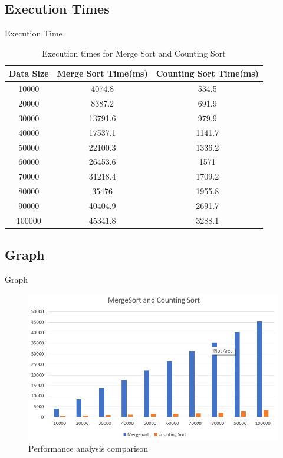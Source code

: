 \documentclass{beamer}
\begin{document}
\subsection{Execution Times}

\begin{frame}{Execution Time}
	\begin{table}
		\centering
		\begin{tabular}{|c | c | c|} 
			\hline
			Data Size  & Merge Sort Time(ms)  & Counting Sort Time(ms) \\ [0.5ex]
			\hline
			10000 & 4074.8 & 534.5 \\
			\hline
			20000 & 8387.2 & 691.9 \\
			\hline
			30000 & 13791.6 & 979.9 \\
			\hline
			40000 & 17537.1 & 1141.7 \\
			\hline
			50000 & 22100.3 & 1336.2 \\
			\hline
			60000 & 26453.6 & 1571 \\
			\hline
			70000 & 31218.4 & 1709.2 \\
			\hline
			80000 & 35476 & 1955.8 \\
			\hline
			90000 & 40404.9 & 2691.7 \\
			\hline
			100000 & 45341.8 & 3288.1 \\
			\hline
		\end{tabular}
		\caption{Execution times for Merge Sort and Counting Sort}
	\end{table}
\end{frame}

\subsection{Graph}
\begin{frame}{Graph}
	\begin{figure}
		\centering
		\includegraphics[width=1\linewidth]{BAR}
		\caption{Performance analysis comparison}

	\end{figure}
	
\end{frame}
\end{document}
